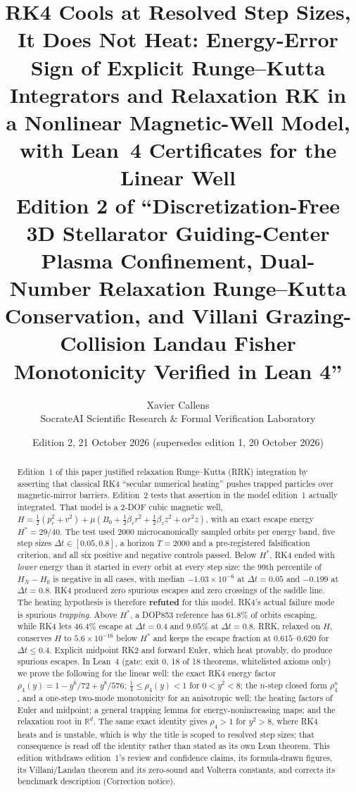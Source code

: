 \documentclass[11pt,a4paper]{article}
\title{\textbf{RK4 Cools at Resolved Step Sizes, It Does Not Heat: Energy-Error Sign of Explicit Runge--Kutta Integrators and Relaxation RK in a Nonlinear Magnetic-Well Model, with Lean~4 Certificates for the Linear Well}\\[4pt]
\large Edition 2 of ``Discretization-Free 3D Stellarator Guiding-Center Plasma Confinement, Dual-Number Relaxation Runge--Kutta Conservation, and Villani Grazing-Collision Landau Fisher Monotonicity Verified in Lean 4''}
\author{Xavier Callens \\ \small SocrateAI Scientific Research \& Formal Verification Laboratory}
\date{Edition 2, 21 October 2026 (supersedes edition 1, 20 October 2026)}
\theoremstyle{definition}
\newcommand{\Hs}{H^{*}}
\begin{document}
\maketitle

\begin{abstract}
Edition~1 of this paper justified relaxation Runge--Kutta (RRK) integration by asserting that classical RK4 ``secular numerical heating'' pushes trapped particles over magnetic-mirror barriers. Edition~2 tests that assertion in the model edition~1 actually integrated. That model is a 2-DOF cubic magnetic well, $H=\tfrac12(p_r^2+v^2)+\mu(B_0+\tfrac12\beta_rr^2+\tfrac12\beta_zz^2+\alpha r^2z)$, with an exact escape energy $\Hs=29/40$. The test used 2000 microcanonically sampled orbits per energy band, five step sizes $\Delta t\in[0.05,0.8]$, a horizon $T=2000$ and a pre-registered falsification criterion, and all six positive and negative controls passed. Below $\Hs$, RK4 ended with \emph{lower} energy than it started in every orbit at every step size: the 99th percentile of $H_N-H_0$ is negative in all cases, with median $-1.03\times10^{-6}$ at $\Delta t=0.05$ and $-0.199$ at $\Delta t=0.8$. RK4 produced zero spurious escapes and zero crossings of the saddle line. The heating hypothesis is therefore \textbf{refuted} for this model. RK4's actual failure mode is spurious \emph{trapping}. Above $\Hs$, a DOP853 reference has $61.8\%$ of orbits escaping, while RK4 lets $46.4\%$ escape at $\Delta t=0.4$ and $9.05\%$ at $\Delta t=0.8$. RRK, relaxed on $H$, conserves $H$ to $5.6\times10^{-16}$ below $\Hs$ and keeps the escape fraction at $0.615$--$0.620$ for $\Delta t\le0.4$. Explicit midpoint RK2 and forward Euler, which heat provably, do produce spurious escapes. In Lean~4 (gate: exit 0, 18 of 18 theorems, whitelisted axioms only) we prove the following for the linear well: the exact RK4 energy factor $\rho_4(y)=1-y^6/72+y^8/576$; $\tfrac14\le\rho_4(y)<1$ for $0<y^2<8$; the $n$-step closed form $\rho_4^n$, and a one-step two-mode monotonicity for an anisotropic well; the heating factors of Euler and midpoint; a general trapping lemma for energy-nonincreasing maps; and the relaxation root in $\mathbb R^d$. The same exact identity gives $\rho_4>1$ for $y^2>8$, where RK4 heats and is unstable, which is why the title is scoped to resolved step sizes; that consequence is read off the identity rather than stated as its own Lean theorem. This edition withdraws edition~1's review and confidence claims, its formula-drawn figures, its Villani/Landau theorem and its zero-sound and Volterra constants, and corrects its benchmark description (Correction notice).
\end{abstract}
\end{document}
